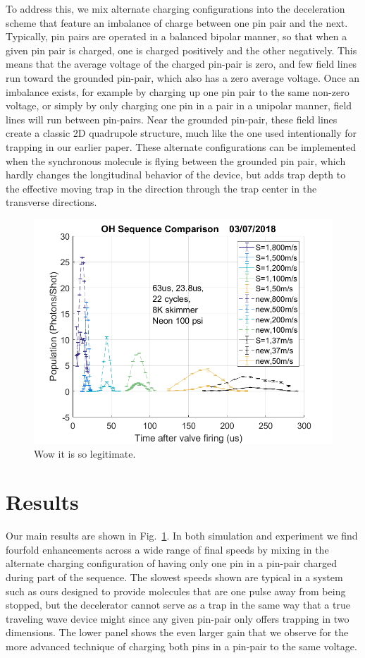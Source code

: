 \documentclass[%
 reprint,
 amsmath,amssymb,
 aps,
pra,
]{revtex4-1}
\begin{document}
To address this, we mix alternate charging configurations into the deceleration scheme that feature an imbalance of charge between one pin pair and the next. Typically, pin pairs are operated in a balanced bipolar manner, so that when a given pin pair is charged, one is charged positively and the other negatively. This means that the average voltage of the charged pin-pair is zero, and few field lines run toward the grounded pin-pair, which also has a zero average voltage. Once an imbalance exists, for example by charging up one pin pair to the same non-zero voltage, or simply by only charging one pin in a pair in a unipolar manner, field lines will run between pin-pairs. Near the grounded pin-pair, these field lines create a classic 2D quadrupole structure, much like the one used intentionally for trapping in our earlier paper. These alternate configurations can be implemented when the synchronous molecule is flying between the grounded pin pair, which hardly changes the longitudinal behavior of the device, but adds trap depth to the effective moving trap in the direction through the trap center in the transverse directions.

\begin{figure}[t]
\includegraphics[width=\linewidth]{speedvary.png}%
\caption{
Wow it is so legitimate.
}
\label{fig:speedvary}
\end{figure}


\section{Results}
Our main results are shown in Fig.~\ref{fig:speedvary}. In both simulation and experiment we find fourfold enhancements across a wide range of final speeds by mixing in the alternate charging configuration of having only one pin in a pin-pair charged during part of the sequence. The slowest speeds shown are typical in a system such as ours designed to provide molecules that are one pulse away from being stopped, but the decelerator cannot serve as a trap in the same way that a true traveling wave device might since any given pin-pair only offers trapping in two dimensions. The lower panel shows the even larger gain that we observe for the more advanced technique of charging both pins in a pin-pair to the same voltage.
\end{document}
